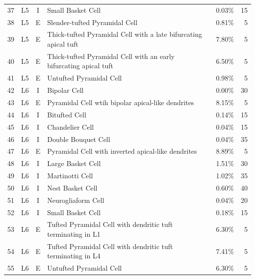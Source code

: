 \begin{longtable}{clclrr}
37  &      L5   &      I    &      Small Basket Cell        &      0.03\%       &   15  \\
38  &      L5   &      E    &      Slender-tufted Pyramidal Cell        &      0.81\%       &   5   \\
39  &      L5   &      E    &      Thick-tufted Pyramidal Cell with a late bifurcating apical tuft      &      7.80\%       &   5   \\
40  &      L5   &      E    &      Thick-tufted Pyramidal Cell with an early bifurcating apical tuft        &      6.50\%       &   5   \\
41  &      L5   &      E    &      Untufted Pyramidal Cell      &      0.98\%       &   5   \\
42  &      L6   &      I    &      Bipolar Cell         &      0.00\%       &   30  \\
43  &      L6   &      E    &      Pyramidal Cell wtih bipolar apical-like dendrites        &      8.15\%       &   5   \\
44  &      L6   &      I    &      Bitufted Cell        &      0.14\%       &   15  \\
45  &      L6   &      I    &      Chandelier Cell      &      0.04\%       &   15  \\
46  &      L6   &      I    &      Double Bouquet Cell      &      0.04\%       &   35  \\
47  &      L6   &      E    &      Pyramidal Cell with inverted apical-like dendrites       &      8.89\%       &   5   \\
48  &      L6   &      I    &      Large Basket Cell        &      1.51\%       &   30  \\
49  &      L6   &      I    &      Martinotti Cell      &      1.02\%       &   35  \\
50  &      L6   &      I    &      Nest Basket Cell         &      0.60\%       &   40  \\
51  &      L6   &      I    &      Neurogliaform Cell       &      0.04\%       &   20  \\
52  &      L6   &      I    &      Small Basket Cell        &      0.18\%       &   15  \\
53  &      L6   &      E    &      Tufted Pyramidal Cell with dendritic tuft terminating in L1          &      6.30\%       &   5   \\
54  &      L6   &      E    &      Tufted Pyramidal Cell with dendritic tuft terminating in L4          &      7.41\%       &   5   \\
55  &      L6   &      E    &      Untufted Pyramidal Cell      &      6.30\%       &   5   \\
\hline
\end{longtable}

\normalsize

\renewcommand{\thetable}{\thechapter.\arabic{table}}
\setcounter{table}{0}

\renewcommand{\thefigure}{\thechapter.\arabic{figure}}
\renewcommand{\figurename}{Fig}
\setcounter{figure}{0}

